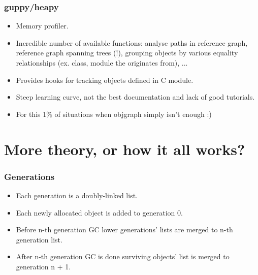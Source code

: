 \documentclass{beamer}
\begin{document}
    \begin{frame}
        \frametitle{guppy/heapy}
        \begin{itemize}
            \item Memory profiler.
            \item Incredible number of available functions: analyse paths in reference graph, reference graph spanning trees (!), grouping objects by various equality relationships (ex. class, module the originates from), ...
            \item Provides hooks for tracking objects defined in C module.
            \item Steep learning curve, not the best documentation and lack of good tutorials.
            \item For this 1\% of situations when objgraph simply isn't enough :)
        \end{itemize}
    \end{frame}

\section{More theory, or how it all works?}
\frame\sectionpage

    \begin{frame}
        \frametitle{Generations}
        \begin{itemize}
            \item Each generation is a doubly-linked list.
            \item Each newly allocated object is added to generation 0.
            \item Before n-th generation GC lower generations' lists are merged to n-th generation list.
            \item After n-th generation GC is done surviving objects' list is merged to generation n + 1.
        \end{itemize}
    \end{frame}
\end{document}

